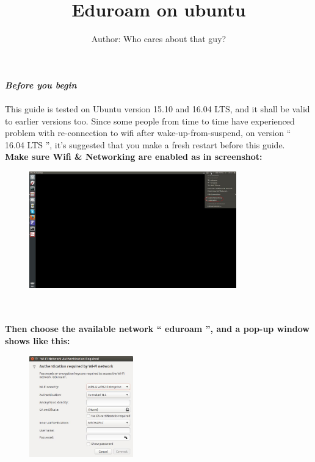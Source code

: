 \documentclass[a4paper]{article}
\title{Eduroam on ubuntu }
\author{Author: Who cares about that guy?}
\begin{document}
\maketitle

\noindent
\textbf{\emph{Before you begin}}\\\\
This guide is tested on Ubuntu version 15.10 and 16.04 LTS, and it shall be valid to earlier versions too. Since some people from time to time have experienced problem with re-connection to wifi after wake-up-from-suspend, on version `` 16.04 LTS '', it's suggested that you make a fresh restart before this guide.\\

\noindent
\textbf{Make sure Wifi \& Networking are enabled as in screenshot:}
\begin{figure}[h!]
  \centering
  \includegraphics[width=0.8\textwidth]{pic1.jpg}
\end{figure}\\\\

\noindent
\textbf{Then choose the available network `` eduroam '', and a pop-up window shows like this:}
\begin{figure}[h!]
  \centering
  \includegraphics[width=0.4\textwidth]{pic2.jpg}
\end{figure}\\\\
\end{document}
